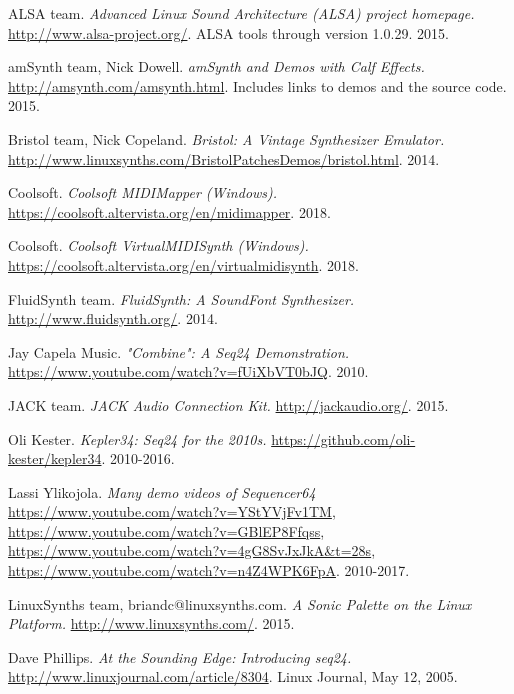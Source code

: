\begin{thebibliography}{99}

   ALSA team.
   \emph{Advanced Linux Sound Architecture (ALSA) project homepage.}
   \url{http://www.alsa-project.org/}.
   ALSA tools through version 1.0.29.
   2015.

   amSynth team, Nick Dowell.
   \emph{amSynth and Demos with Calf Effects.}
   \url{http://amsynth.com/amsynth.html}.
   Includes links to demos and the source code.
   2015.

   Bristol team, Nick Copeland.
   \emph{Bristol: A Vintage Synthesizer Emulator.}
   \url{http://www.linuxsynths.com/BristolPatchesDemos/bristol.html}.
   2014.

   Coolsoft.
   \emph{Coolsoft MIDIMapper (Windows).}
   \url{https://coolsoft.altervista.org/en/midimapper}.
   2018.

   Coolsoft.
   \emph{Coolsoft VirtualMIDISynth (Windows).}
   \url{https://coolsoft.altervista.org/en/virtualmidisynth}.
   2018.

   FluidSynth team.
   \emph{FluidSynth: A SoundFont Synthesizer.}
   \url{http://www.fluidsynth.org/}.
   2014.

   Jay Capela Music.
   \emph{"Combine": A Seq24 Demonstration.}
   \url{https://www.youtube.com/watch?v=fUiXbVT0bJQ}.
   2010.

   JACK team.
   \emph{JACK Audio Connection Kit.}
   \url{http://jackaudio.org/}.
   2015.

   Oli Kester.
   \emph{Kepler34: Seq24 for the 2010s.}
   \url{https://github.com/oli-kester/kepler34}.
   2010-2016.

   Lassi Ylikojola.
   \emph{Many demo videos of Sequencer64}
   \url{https://www.youtube.com/watch?v=YStYVjFv1TM},
   \url{https://www.youtube.com/watch?v=GBlEP8Ffqss},
   \url{https://www.youtube.com/watch?v=4gG8SvJxJkA&t=28s},
   \url{https://www.youtube.com/watch?v=n4Z4WPK6FpA}.
   2010-2017.

   LinuxSynths team, briandc@linuxsynths.com.
   \emph{A Sonic Palette on the Linux Platform.}
   \url{http://www.linuxsynths.com/}.
   2015.

   Dave Phillips.
   \emph{At the Sounding Edge: Introducing seq24.}
   \url{http://www.linuxjournal.com/article/8304}.
   Linux Journal, May 12, 2005.


\end{thebibliography}
